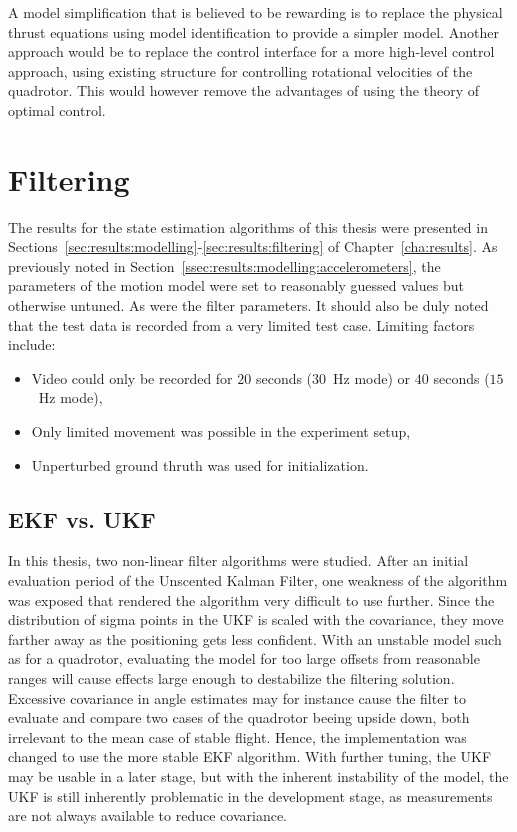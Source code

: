         A model simplification that is believed to be rewarding
        is to replace the physical thrust equations using model identification
        to provide a simpler model. Another approach would be to replace the
        control interface for a more high-level control approach, using
        existing structure for controlling rotational velocities of the
        quadrotor. This would however remove the advantages of using
        the theory of optimal control.

    \section{Filtering}
        The results for the state estimation algorithms of this thesis
        were presented in Sections~\ref{sec:results:modelling}-\ref{sec:results:filtering} of Chapter~\ref{cha:results}.
        As previously noted in Section~\ref{ssec:results:modelling:accelerometers},
        the parameters of the motion model were set to reasonably guessed values
        but otherwise untuned. As were the filter parameters.
        It should also be duly noted that the test data is recorded from a very limited test
        case. Limiting factors include:
        \begin{itemize}
            \item Video could only be recorded for $20$ seconds ($30$~Hz mode) or $40$ seconds ($15$~Hz mode),
            \item Only limited movement was possible in the experiment setup,
            \item Unperturbed ground thruth was used for initialization.
        \end{itemize}

        \subsection{EKF vs. UKF}
            In this thesis, two non-linear filter algorithms were studied.
            After an initial evaluation period of the Unscented Kalman Filter,
            one weakness of the algorithm was exposed that rendered the
            algorithm very difficult to use further.
            Since the distribution of sigma points in the UKF is scaled with
            the covariance, they move farther away as the positioning gets
            less confident.
            With an unstable model such as for a quadrotor,
            evaluating the model for too large offsets from reasonable ranges
            will cause effects large enough to destabilize the filtering solution.
            Excessive covariance in angle estimates may for instance
            cause the filter to evaluate and compare two cases of the quadrotor
            beeing upside down, both irrelevant to the mean case of stable flight.
            Hence, the implementation was changed to use the more stable EKF algorithm.
            With further tuning, the UKF may be usable in a later stage, but with the inherent
            instability of the model, the UKF is still inherently problematic in
            the development stage, as measurements are not always
            available to reduce covariance.

